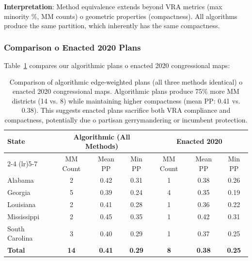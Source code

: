 \textbf{Interpretation}: Method equivalence extends beyond VRA metrics (max minority \%, MM counts) 	o geometric properties (compactness). All algorithms produce the same partition, which inherently has the same compactness.

\subsubsection{Comparison 	o Enacted 2020 Plans}

Table~\ref{tab:enacted-comparison} compares our algorithmic plans 	o enacted 2020 congressional maps:

\begin{table}[h]
\centering
\small
\begin{tabular}{lcccccc}
\toprule
\multirow{2}{*}{\textbf{State}} & \multicolumn{3}{c}{\textbf{Algorithmic (All Methods)}} & \multicolumn{3}{c}{\textbf{Enacted 2020}} \\
\cmidrule(lr){2-4} \cmidrule(lr){5-7}
 & MM Count & Mean PP & Min PP & MM Count & Mean PP & Min PP \\
\midrule
Alabama & 2 & 0.42 & 0.31 & 1 & 0.38 & 0.26 \\
Georgia & 5 & 0.39 & 0.24 & 4 & 0.35 & 0.19 \\
Louisiana & 2 & 0.41 & 0.28 & 1 & 0.36 & 0.22 \\
Mississippi & 2 & 0.45 & 0.35 & 1 & 0.42 & 0.31 \\
South Carolina & 3 & 0.40 & 0.29 & 1 & 0.37 & 0.25 \\
\midrule
\textbf{Total} & \textbf{14} & \textbf{0.41} & \textbf{0.29} & \textbf{8} & \textbf{0.38} & \textbf{0.25} \\
\bottomrule
\end{tabular}
\caption{Comparison of algorithmic edge-weighted plans (all three methods identical) 	o enacted 2020 congressional maps. Algorithmic plans produce 75\% more MM districts (14 vs. 8) while maintaining higher compactness (mean PP: 0.41 vs. 0.38). This suggests enacted plans sacrifice both VRA compliance and compactness, potentially due 	o partisan gerrymandering or incumbent protection.}
\label{tab:enacted-comparison}
\end{table}

